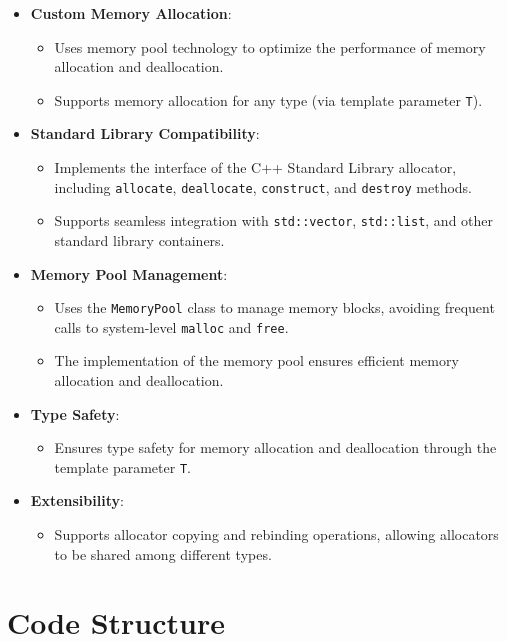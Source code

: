 \documentclass[a4paper]{article}
\begin{document}
  \begin{itemize}
      \item \textbf{Custom Memory Allocation}:
      \begin{itemize}
          \item Uses memory pool technology to optimize the performance of memory allocation and deallocation.
          \item Supports memory allocation for any type (via template parameter \texttt{T}).
      \end{itemize}
      \item \textbf{Standard Library Compatibility}:
      \begin{itemize}
          \item Implements the interface of the C++ Standard Library allocator, including \texttt{allocate}, \texttt{deallocate}, \texttt{construct}, and \texttt{destroy} methods.
          \item Supports seamless integration with \texttt{std::vector}, \texttt{std::list}, and other standard library containers.
      \end{itemize}
      \item \textbf{Memory Pool Management}:
      \begin{itemize}
          \item Uses the \texttt{MemoryPool} class to manage memory blocks, avoiding frequent calls to system-level \texttt{malloc} and \texttt{free}.
          \item The implementation of the memory pool ensures efficient memory allocation and deallocation.
      \end{itemize}
      \item \textbf{Type Safety}:
      \begin{itemize}
          \item Ensures type safety for memory allocation and deallocation through the template parameter \texttt{T}.
      \end{itemize}
      \item \textbf{Extensibility}:
      \begin{itemize}
          \item Supports allocator copying and rebinding operations, allowing allocators to be shared among different types.
      \end{itemize}
  \end{itemize}
  
  \section{Code Structure}
  
\end{document}
